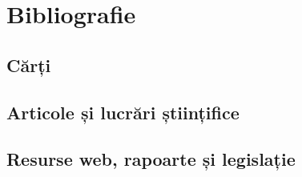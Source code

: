 \documentclass[../../main.tex]{subfiles}
\begin{document}
\chapter*{Bibliografie}
\label{ch:bibliography}


\section*{Cărți}
\label{sec:bibliography_books}

\printbibliography[type=book,heading=none]

\section*{Articole și lucrări științifice}
\label{sec:bibliography_papers}

\printbibliography[filter=stiintific,heading=none]

\section*{Resurse web, rapoarte și legislație}
\label{sec:bibliography_web}

\printbibliography[filter=webresurse,heading=none]
\end{document}
